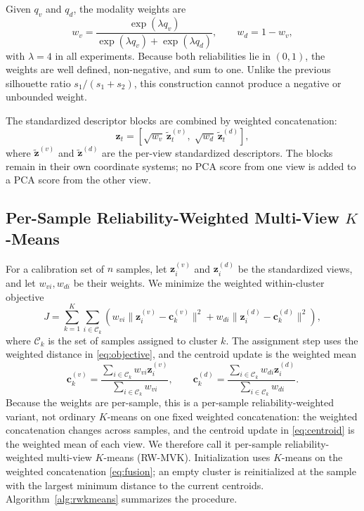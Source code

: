 \documentclass[final,3p,times]{elsarticle}
\begin{document}
Given $q_v$ and $q_d$, the modality weights are
\begin{equation}
w_v = \frac{\exp(\lambda q_v)}{\exp(\lambda q_v)+\exp(\lambda q_d)},
\qquad
w_d = 1-w_v,
\label{eq:weights}
\end{equation}
with $\lambda=4$ in all experiments. Because both reliabilities lie in $(0,1)$, the weights are well defined, non-negative, and sum to one. Unlike the previous silhouette ratio $s_1/(s_1+s_2)$, this construction cannot produce a negative or unbounded weight.

The standardized descriptor blocks are combined by weighted concatenation:
\begin{equation}
\mathbf{z}_t =
\left[
\sqrt{w_v}\,\tilde{\mathbf{z}}^{(v)}_t,\;
\sqrt{w_d}\,\tilde{\mathbf{z}}^{(d)}_t
\right],
\label{eq:fusion}
\end{equation}
where $\tilde{\mathbf{z}}^{(v)}$ and $\tilde{\mathbf{z}}^{(d)}$ are the per-view standardized descriptors. The blocks remain in their own coordinate systems; no PCA score from one view is added to a PCA score from the other view.

\subsection{Per-Sample Reliability-Weighted Multi-View $K$-Means}
\label{subsec:rwkmeans}
For a calibration set of $n$ samples, let $\mathbf{z}^{(v)}_i$ and $\mathbf{z}^{(d)}_i$ be the standardized views, and let $w_{vi},w_{di}$ be their weights. We minimize the weighted within-cluster objective
\begin{equation}
J = \sum_{k=1}^{K}\sum_{i\in \mathcal{C}_k}
\left(
w_{vi}\|\mathbf{z}^{(v)}_i-\mathbf{c}^{(v)}_k\|^2
+
w_{di}\|\mathbf{z}^{(d)}_i-\mathbf{c}^{(d)}_k\|^2
\right),
\label{eq:objective}
\end{equation}
where $\mathcal{C}_k$ is the set of samples assigned to cluster $k$. The assignment step uses the weighted distance in \eqref{eq:objective}, and the centroid update is the weighted mean
\begin{equation}
\mathbf{c}^{(v)}_k =
\frac{\sum_{i\in\mathcal{C}_k} w_{vi}\mathbf{z}^{(v)}_i}
{\sum_{i\in\mathcal{C}_k} w_{vi}},
\qquad
\mathbf{c}^{(d)}_k =
\frac{\sum_{i\in\mathcal{C}_k} w_{di}\mathbf{z}^{(d)}_i}
{\sum_{i\in\mathcal{C}_k} w_{di}}.
\label{eq:centroid}
\end{equation}
Because the weights are per-sample, this is a per-sample reliability-weighted variant, not ordinary $K$-means on one fixed weighted concatenation: the weighted concatenation changes across samples, and the centroid update in \eqref{eq:centroid} is the weighted mean of each view. We therefore call it per-sample reliability-weighted multi-view $K$-means (RW-MVK). Initialization uses $K$-means on the weighted concatenation \eqref{eq:fusion}; an empty cluster is reinitialized at the sample with the largest minimum distance to the current centroids. Algorithm~\ref{alg:rwkmeans} summarizes the procedure.
\end{document}
